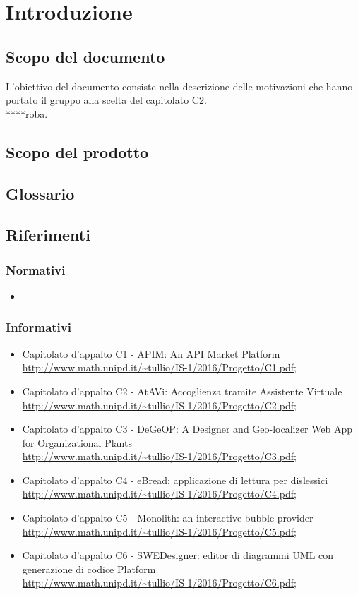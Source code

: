 \section {Introduzione}
	\subsection {Scopo del documento}
L'obiettivo del documento consiste nella descrizione delle motivazioni che 				hanno portato il gruppo \GRUPPO{} alla scelta del capitolato C2.  \\
****roba. 
	\subsection {Scopo del prodotto}
		\SCOPO
	\subsection {Glossario}
		\GLOSSARIO
	\subsection {Riferimenti}
		\subsubsection {Normativi}
			\begin {itemize}
				\item \NPdoc
			\end {itemize}
		\subsubsection {Informativi}
			\begin {itemize}
				\item Capitolato d'appalto C1 - APIM: An API Market Platform \\
					\url {http://www.math.unipd.it/~tullio/IS-1/2016/Progetto/C1.pdf};
				\item Capitolato d'appalto C2 - AtAVi: Accoglienza tramite Assistente Virtuale \\
				\url {http://www.math.unipd.it/~tullio/IS-1/2016/Progetto/C2.pdf};
				\item Capitolato d'appalto C3 - DeGeOP: A Designer and Geo-localizer Web App for Organizational Plants \\
					\url {http://www.math.unipd.it/~tullio/IS-1/2016/Progetto/C3.pdf};
					\item Capitolato d'appalto C4 - eBread: applicazione di lettura per dislessici  \\
					\url {http://www.math.unipd.it/~tullio/IS-1/2016/Progetto/C4.pdf};
					\item Capitolato d'appalto C5 - Monolith: an interactive bubble provider \\
					\url {http://www.math.unipd.it/~tullio/IS-1/2016/Progetto/C5.pdf};
									\item Capitolato d'appalto C6 - SWEDesigner: editor di diagrammi UML con generazione di codice Platform \\
					\url {http://www.math.unipd.it/~tullio/IS-1/2016/Progetto/C6.pdf};
					
				
			\end {itemize}
		
		